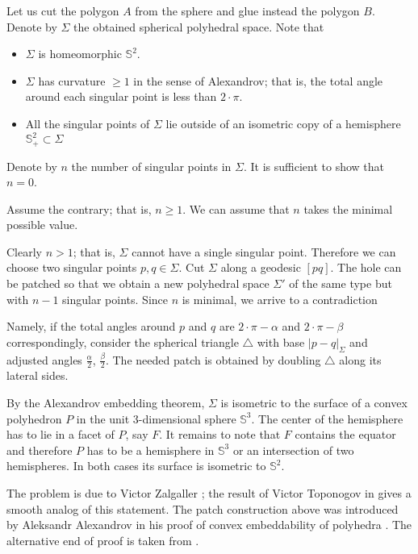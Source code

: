 Let us cut the polygon $A$ from the sphere and glue instead the polygon $B$.
Denote by $\Sigma$ the obtained spherical polyhedral space.
Note that 
\begin{itemize}
\item $\Sigma$ is homeomorphic $\mathbb S^2$.
\item $\Sigma$ has curvature $\ge 1$ in the sense of Alexandrov; that is, the total angle around each singular point is less than $2\cdot \pi$.
\item All the singular points of $\Sigma$ 
lie outside of an isometric copy of a hemisphere $\mathbb{S}^2_+\subset \Sigma$
\end{itemize}

Denote by $n$ the number of singular points in $\Sigma$.
It is sufficient to show that $n=0$.

Assume the contrary; that is, $n\ge 1$.
We can assume that $n$ takes the minimal possible value.

Clearly $n>1$;
that is, $\Sigma$ cannot have a single singular point.
Therefore we can choose two singular points $p,q\in \Sigma$.
Cut $\Sigma$ along a geodesic $[pq]$.
The hole can be patched so that we obtain a new polyhedral space $\Sigma'$ of the same type but with $n-1$ singular points.
Since $n$ is minimal, we arrive to a contradiction

Namely, if the total angles around $p$ and $q$ are $2\cdot \pi-\alpha$ and $2\cdot \pi-\beta$ correspondingly,
consider the spherical triangle $\triangle$ with base $|p-q|_\Sigma$ and adjusted angles $\tfrac\alpha2$, $\tfrac\beta2$. 
The needed patch is obtained by doubling $\triangle$ along its lateral sides.
\qeds

By the Alexandrov embedding theorem, $\Sigma$ is isometric to the surface of a convex polyhedron $P$ in the unit 3-dimensional sphere $\mathbb S^3$. 
The center of the hemisphere has to lie in a facet of $P$, say $F$.
It remains to note that $F$ contains the equator and therefore $P$ has to be a hemisphere in $\mathbb S^3$ or an intersection of two hemispheres.
In both cases its surface is isometric to $\mathbb S^2$.
\qeds

The problem is due to Victor Zalgaller \cite{zalgaller-shperical-polygon};
the result of Victor Toponogov in \cite{toponogov} gives a smooth analog of this statement.
The patch construction above was introduced by 
Aleksandr Alexandrov
in his proof of convex embeddability of polyhedra
\cite[see VI, \S7 in][]{alexandrov1948}.
The alternative end of proof is taken from \cite{panov-petrunin}.



